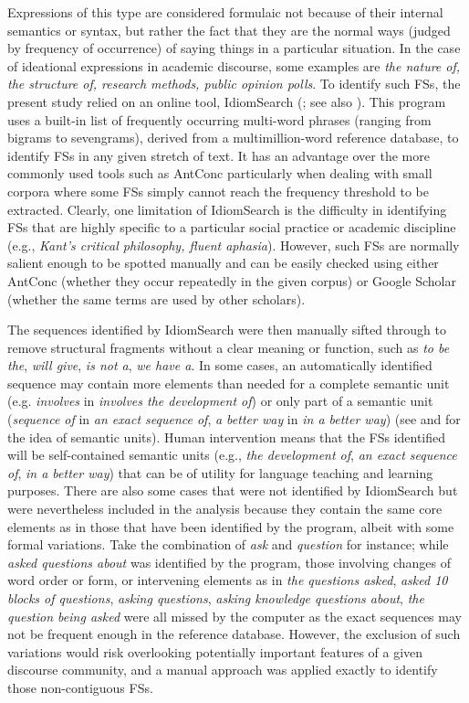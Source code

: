 Expressions of this type are considered formulaic not because of their internal semantics or syntax, but rather the fact that they are the normal ways (judged by frequency of occurrence) of saying things in a particular situation. In the case of ideational expressions in academic discourse, some examples are \textit{the nature of, the structure of, research methods, public opinion polls}. To identify such FSs, the present study relied on an online tool, IdiomSearch (\citealt{Colson2016a}; see also \citealt{Colson2016b}). This program uses a built-in list of frequently occurring multi-word phrases (ranging from bigrams to sevengrams), derived from a multimillion-word reference database, to identify FSs in any given stretch of text. It has an advantage over the more commonly used tools such as AntConc particularly when dealing with small corpora where some FSs simply cannot reach the frequency threshold to be extracted. Clearly, one limitation of IdiomSearch is the difficulty in identifying FSs that are highly specific to a particular social practice or academic discipline (e.g., \textit{Kant’s critical philosophy, fluent aphasia}). However, such FSs are normally salient enough to be spotted manually and can be easily checked using either AntConc (whether they occur repeatedly in the given corpus) or Google Scholar (whether the same terms are used by other scholars).

The sequences identified by IdiomSearch were then manually sifted through to remove structural fragments without a clear meaning or function, such as \textit{to be the}, \textit{will give}, \textit{is not a}, \textit{we have a}. In some cases, an automatically identified sequence may contain more elements than needed for a complete semantic unit (e.g. \textit{involves} in \textit{involves the development of}) or only part of a semantic unit (\textit{sequence of} in \textit{an exact sequence of}, \textit{a better way} in \textit{in a better way}) (see \citealt{MartinezSchmitt2012} and \citealt{Buerki2016} for the idea of semantic units). Human intervention means that the FSs identified will be self-contained semantic units (e.g., \textit{the development of}, \textit{an exact sequence of}, \textit{in a better way}) that can be of utility for language teaching and learning purposes. There are also some cases that were not identified by IdiomSearch but were nevertheless included in the analysis because they contain the same core elements as in those that have been identified by the program, albeit with some formal variations. Take the combination of \textit{ask} and \textit{question} for instance; while \textit{asked questions about} was identified by the program, those involving changes of word order or form, or intervening elements as in \textit{the questions asked}, \textit{asked 10 blocks of questions}, \textit{asking questions}, \textit{asking knowledge questions about}, \textit{the question being asked} were all missed by the computer as the exact sequences may not be frequent enough in the reference database. However, the exclusion of such variations would risk overlooking potentially important features of a given discourse community, and a manual approach was applied exactly to identify those non-contiguous FSs.

